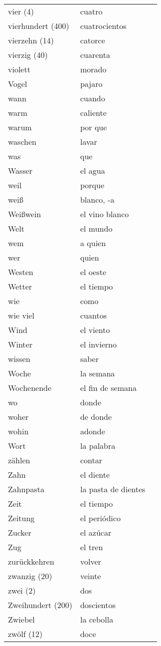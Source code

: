\documentclass[10pt,spanish]{article}
\begin{document}
\begin{longtable}{p{} p{} | p{}}
vier (4) & cuatro  \\
vierhundert (400) & cuatrocientos  \\
vierzehn (14) & catorce  \\
vierzig (40) & cuarenta  \\
violett & morado  \\
Vogel & pajaro  \\
wann & cuando  \\
warm & caliente  \\
warum & por que  \\
waschen & lavar  \\
was & que  \\
Wasser & el agua \\
weil & porque  \\
weiß & blanco, -a  \\
Weißwein & el vino blanco  \\
Welt & el mundo \\
wem & a quien  \\
wer & quien  \\
Westen & el oeste  \\
Wetter & el tiempo  \\
wie & como  \\
wie viel& cuantos  \\
Wind & el viento  \\
Winter & el invierno  \\
wissen & saber  \\
Woche & la semana  \\
Wochenende & el fin de semana  \\
wo & donde  \\
woher & de donde  \\
wohin & adonde  \\
Wort & la palabra \\
zählen & contar  \\
Zahn & el diente \\
Zahnpasta & la pasta de dientes \\
Zeit & el tiempo  \\
Zeitung & el periódico  \\
Zucker & el azúcar  \\
Zug & el tren  \\
zurückkehren & volver  \\
zwanzig (20) & veinte  \\
zwei (2) & dos  \\
Zweihundert (200) & doscientos  \\
Zwiebel & la cebolla  \\
zwölf (12) & doce \\
\end{longtable}
\end{document}
